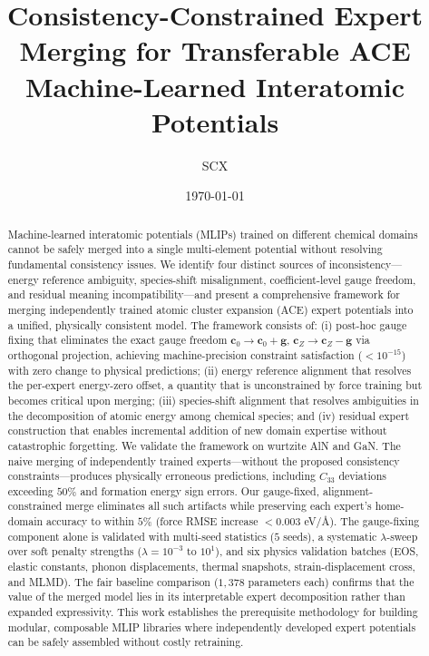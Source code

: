\documentclass[twoside,prb,aps,floatfix,superscriptaddress,longbibliography]{revtex4-2}
\newcommand{\AAng}{\mbox{\AA}}
\newcommand{\g}{\mathbf{g}}
\newcommand{\cZ}{\mathbf{c}_{Z}}
\newcommand{\cb}{\mathbf{c}_{0}}
\begin{document}
\title{Consistency-Constrained Expert Merging for Transferable ACE \\
Machine-Learned Interatomic Potentials}

\author{SCX}

\date{\today}

\begin{abstract}
Machine-learned interatomic potentials (MLIPs) trained on different chemical domains cannot be safely merged into a single multi-element potential without resolving fundamental consistency issues. We identify four distinct sources of inconsistency---energy reference ambiguity, species-shift misalignment, coefficient-level gauge freedom, and residual meaning incompatibility---and present a comprehensive framework for merging independently trained atomic cluster expansion (ACE) expert potentials into a unified, physically consistent model. The framework consists of: (i) post-hoc gauge fixing that eliminates the exact gauge freedom $\cb \to \cb + \g$, $\cZ \to \cZ - \g$ via orthogonal projection, achieving machine-precision constraint satisfaction ($< 10^{-15}$) with zero change to physical predictions; (ii) energy reference alignment that resolves the per-expert energy-zero offset, a quantity that is unconstrained by force training but becomes critical upon merging; (iii) species-shift alignment that resolves ambiguities in the decomposition of atomic energy among chemical species; and (iv) residual expert construction that enables incremental addition of new domain expertise without catastrophic forgetting. We validate the framework on wurtzite AlN and GaN. The naive merging of independently trained experts---without the proposed consistency constraints---produces physically erroneous predictions, including $C_{33}$ deviations exceeding $50\%$ and formation energy sign errors. Our gauge-fixed, alignment-constrained merge eliminates all such artifacts while preserving each expert's home-domain accuracy to within $5\%$ (force RMSE increase $< 0.003$ eV/\AAng). The gauge-fixing component alone is validated with multi-seed statistics ($5$ seeds), a systematic $\lambda$-sweep over soft penalty strengths ($\lambda = 10^{-3}$ to $10^1$), and six physics validation batches (EOS, elastic constants, phonon displacements, thermal snapshots, strain-displacement cross, and MLMD). The fair baseline comparison ($1{,}378$ parameters each) confirms that the value of the merged model lies in its interpretable expert decomposition rather than expanded expressivity. This work establishes the prerequisite methodology for building modular, composable MLIP libraries where independently developed expert potentials can be safely assembled without costly retraining.
\end{abstract}
\end{document}
